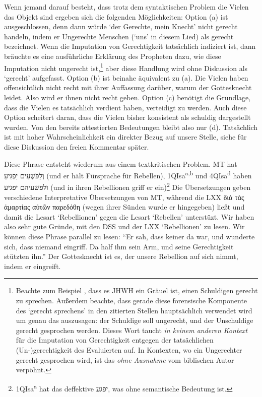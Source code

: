 \begin{description}
		Wenn jemand darauf besteht, dass trotz dem syntaktischen Problem die Vielen das Objekt sind ergeben sich die folgenden Möglichkeiten:
		Option (a) ist ausgeschlossen, denn dann würde `der Gerechte, mein Knecht' nicht gerecht handeln, indem er Ungerechte Menschen (`uns' in diesem Lied) als gerecht bezeichnet.
		Wenn die Imputation von Gerechtigkeit tatsächlich indiziert ist, dann bräuchte es eine ausführliche Erklärung des Propheten dazu,
		wie diese Imputation nicht ungerecht ist,\footnote{
			Beachte zum Beispiel , dass es JHWH ein Gräuel ist, einen Schuldigen gerecht zu sprechen.
			Außerdem beachte, dass gerade diese forensische Komponente des `gerecht sprechens' in den zitierten Stellen hauptsächlich verwendet wird um genau das auszusagen:
			der Schuldige soll ungerecht, und der Unschuldige gerecht gesprochen werden.
			Dieses Wort taucht \textit{in keinem anderen Kontext} für die Imputation von Gerechtigkeit entgegen der tatsächlichen (Un-)gerechtigkeit des Evaluierten auf.
			In Kontexten, wo ein Ungerechter gerecht gesprochen wird, ist das \textit{ohne Ausnahme} vom biblischen Autor verpöhnt.
		}
		aber diese Handlung wird ohne Diskussion als `gerecht' aufgefasst.
		Option (b) ist beinahe äquivalent zu (a). Die Vielen haben offensichtlich nicht recht mit ihrer Auffassung darüber, warum der Gottesknecht leidet. Also wird er ihnen nicht recht geben.
		Option (c) benötigt die Grundlage, dass die Vielen es tatsächlich verdient haben, verteidigt zu werden.
		Auch diese Option scheitert daran, dass die Vielen bisher konsistent als schuldig dargestellt wurden.
		Von den bereits attestierten Bedeutungen bleibt also nur (d). Tatsächlich ist  mit hoher Wahrscheinlichkeit ein direkter Bezug auf unsere Stelle, siehe für diese Diskussion den freien Kommentar später.
	\item[12 in ihren Rebellionen griff er ein] Diese Phrase entsteht wiederum aus einem textkritischen Problem.
		MT hat וְלַפֹּשְׁעִים יַפְגִּיעַ (und er hält Fürsprache für Rebellen), 1QIsa\textsuperscript{a,b} und 4QIsa\textsuperscript{d} haben ולפשׁעיהם יפגיע (und in ihren Rebellionen griff er ein)\footnote{1QIsa\textsuperscript{a} hat das deffektive יפגע, was ohne semantische Bedeutung ist.}
		Die Übersetzungen geben verschiedene Interpretative Übersetzungen von MT, während die LXX διὰ τὰς ἁμαρτίας αὐτῶν παρεδόθη (wegen ihrer Sünden wurde er hingegeben) ließt und damit die Lesart `Rebellionen' gegen die Lesart `Rebellen' unterstüzt.
		Wir haben also sehr gute Gründe, mit den DSS und der LXX `Rebellionen' zu lesen.
		Wir können diese Phrase parallel zu  lesen: ``Er sah, dass keiner da war, und wunderte sich, dass niemand eingriff. Da half ihm sein Arm, und seine Gerechtigkeit stützten ihn.''
		Der Gottesknecht ist es, der unsere Rebellion auf sich nimmt, indem er eingreift.
\end{description}

